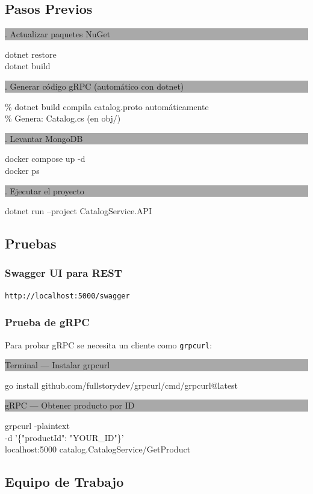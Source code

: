 \documentclass[12pt,a4paper]{article}
\newcommand{\codeblock}[2]{%
  \vspace{4pt}%
  \noindent\colorbox{darkgray}{\parbox{\dimexpr\textwidth-2\fboxsep}{%
    \bfseries\small\color{white}\strut\quad #1}}%
  \begin{codeframe}%
  {\color{codetext}\ttfamily\small\sloppy%
  \setlength{\parindent}{0pt}%
  #2}%
  \end{codeframe}%
  \vspace{4pt}%
}
\begin{document}
\subsection{Pasos Previos}

\codeblock{1. Actualizar paquetes NuGet}{%
dotnet restore\\
dotnet build%
}

\codeblock{2. Generar c\'odigo gRPC (automático con dotnet)}{%
\% dotnet build compila catalog.proto autom\'aticamente\\
\% Genera: Catalog.cs (en obj/)%
}

\codeblock{3. Levantar MongoDB}{%
docker compose up -d\\
docker ps%
}

\codeblock{4. Ejecutar el proyecto}{%
dotnet run --project CatalogService.API%
}

\subsection{Pruebas}

\subsubsection{Swagger UI para REST}
\begin{verbatim}
http://localhost:5000/swagger
\end{verbatim}

\subsubsection{Prueba de gRPC}

Para probar gRPC se necesita un cliente como \texttt{grpcurl}:

\codeblock{Terminal --- Instalar grpcurl}{%
go install github.com/fullstorydev/grpcurl/cmd/grpcurl@latest%
}

\codeblock{gRPC --- Obtener producto por ID}{%
grpcurl -plaintext \\
\quad -d '\{"productId": "YOUR\_ID"\}' \\
\quad localhost:5000 catalog.CatalogService/GetProduct%
}

\vspace{1.5cm}

\subsection{Equipo de Trabajo}
\end{document}
